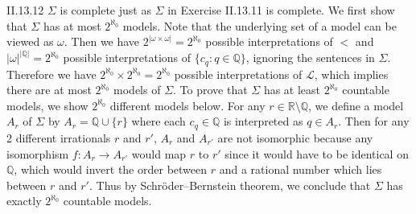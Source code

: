 \documentclass[12pt]{article}
\begin{document}
\begin{customthm}{II.13.12}
  $\Sigma$ is complete just as $\Sigma$ in Exercise II.13.11 is complete. We first show that $\Sigma$ has at most $2^{\aleph_0}$ models. Note that the underlying set of a model can be viewed as $\omega$. Then we have $2^{|\omega\times\omega|}=2^{\aleph_0}$ possible interpretations of $<$ and $|\omega|^{|\mathbb{Q}|}=2^{\aleph_0}$ possible interpretations of $\{c_q:q\in\mathbb{Q}\}$, ignoring the sentences in $\Sigma$. Therefore we have $2^{\aleph_0}\times2^{\aleph_0}=2^{\aleph_0}$ possible interpretations of $\mathcal{L}$, which implies there are at most $2^{\aleph_0}$ models of $\Sigma$. To prove that $\Sigma$ has at least $2^{\aleph_0}$ countable models, we show $2^{\aleph_0}$ different models below. For any $r\in\mathbb{R}\setminus\mathbb{Q}$, we define a model $A_r$ of $\Sigma$ by $A_r=\mathbb{Q}\cup\{r\}$ where each $c_q\in\mathbb{Q}$ is interpreted as $q\in A_r$. Then for any 2 different irrationals $r$ and $r'$, $A_r$ and $A_{r'}$ are not isomorphic because any isomorphism $f:A_r\rightarrow A_{r'}$ would map $r$ to $r'$ since it would have to be identical on $\mathbb{Q}$, which would invert the order between $r$ and a rational number which lies between $r$ and $r'$. Thus by Schröder–Bernstein theorem, we conclude that $\Sigma$ has exactly $2^{\aleph_0}$ countable models.
\end{customthm}
\end{document}
